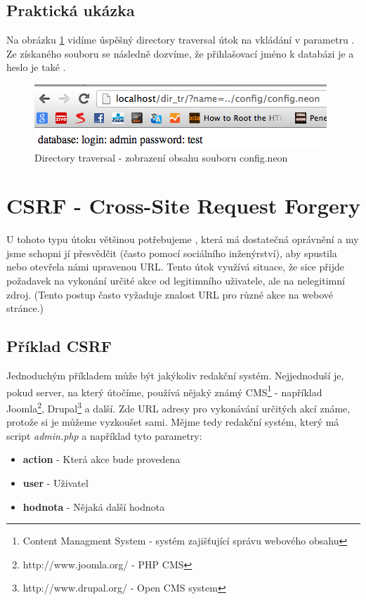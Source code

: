\subsection{Praktická ukázka}
Na obrázku \ref{obr.directory} vidíme úspěšný directory traversal útok na vkládání v parametru . Ze získaného souboru  se následně dozvíme, že přihlašovací jméno k databázi je  a heslo je také .
\begin{figure}[h!]
\centerline{\includegraphics[width=416px]{./examples/dir_ex2.png}}
\caption{Directory traversal - zobrazení obsahu souboru config.neon}
\label{obr.directory}
\end{figure}

\section{CSRF - Cross-Site Request Forgery}
U tohoto typu útoku většinou potřebujeme , která má dostatečná oprávnění a my jsme schopni jí přesvědčit (často pomocí sociálního inženýrství), aby spustila nebo otevřela námi upravenou URL. Tento útok využívá situace, že sice přijde požadavek na vykonání určité akce od legitimního uživatele, ale na nelegitimní zdroj.\cite{cgisecurity} (Tento postup často vyžaduje znalost URL pro různé akce na webové stránce.)

\subsection{Příklad CSRF}
Jednoduchým příkladem může být jakýkoliv redakční systém. Nejjednoduší je, pokud server, na který útočíme, používá nějaký známý CMS\footnote{Content Managment System - systém zajišťující správu webového obsahu} - například Joomla\footnote{http://www.joomla.org/ - PHP CMS}, Drupal\footnote{http://www.drupal.org/ - Open CMS system} a další. Zde URL adresy pro vykonávání určitých akcí známe, protože si je můžeme vyzkoušet sami. Mějme tedy redakční systém, který má script \textit{admin.php} a například tyto parametry:
\begin{itemize}
\item \textbf{action} - Která akce bude provedena
\item \textbf{user} - Uživatel
\item \textbf{hodnota} - Nějaká další hodnota
\end{itemize}

